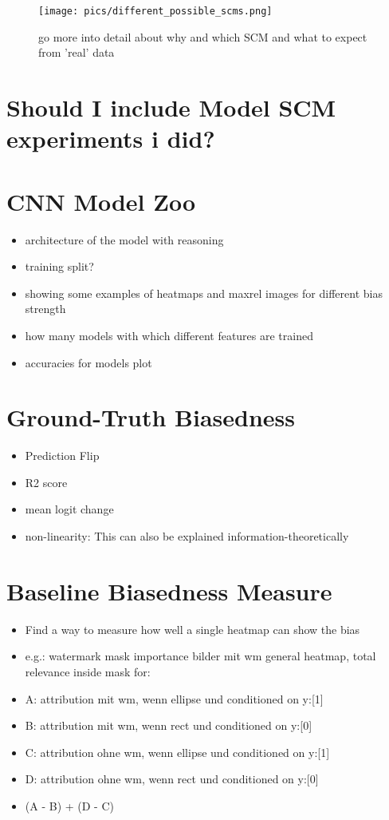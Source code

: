 \begin{figure}
    \centering
    \texttt{[image: pics/different\_possible\_scms.png]}
    \caption{go more into detail about why and which SCM and what to expect from 'real' data}
    \label{fig:possible_scms}
\end{figure}

\section{Should I include Model SCM experiments i did?} 

\section{CNN Model Zoo}
\begin{itemize}
    \item architecture of the model with reasoning 
    \item training split? 
    \item showing some examples of heatmaps and maxrel images for different bias strength
    \item how many models with which different features are trained
    \item accuracies for models plot
\end{itemize}

\section{Ground-Truth Biasedness}
\begin{itemize}
    \item Prediction Flip
    \item R2 score
    \item mean logit change
    \item non-linearity: This can also be explained information-theoretically 
\end{itemize}

\section{Baseline Biasedness Measure}
\begin{itemize}
    \item Find a way to measure how well a single heatmap can show the bias
    \item e.g.: watermark mask importance bilder mit wm general heatmap, total relevance inside mask for:
    \item A: attribution mit wm, wenn ellipse und conditioned on y:[1]
    \item B: attribution mit wm, wenn rect    und conditioned on y:[0]
    \item C: attribution ohne wm, wenn ellipse und conditioned on y:[1]
    \item D: attribution ohne wm, wenn rect    und conditioned on y:[0]
    \item (A - B) + (D - C)
\end{itemize}

